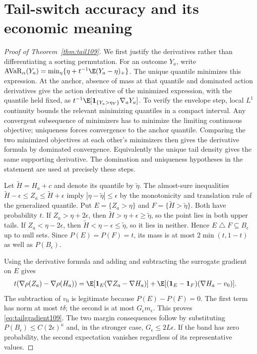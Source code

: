\section{Tail-switch accuracy and its economic meaning}\label{supp:tail109}
\begin{proof}[Proof of Theorem~\ref{thm:tail109}]
We first justify the derivatives rather than differentiating a sorting permutation. For an outcome $Y_a$, write
$\operatorname{AVaR}_\alpha(Y_a)=\min_\eta\{\eta+t^{-1}\E(Y_a-\eta)_+\}$.
The unique quantile minimizes this expression. At the anchor, absence of mass at that quantile and dominated action derivatives give the action derivative of the minimized expression, with the quantile held fixed, as
$t^{-1}\E[\boldsymbol1_{\{Y_a>\eta_Y\}}\nabla_aY_a]$.
To verify the envelope step, local $L^1$ continuity bounds the relevant minimizing quantiles in a compact interval. Any convergent subsequence of minimizers has to minimize the limiting continuous objective; uniqueness forces convergence to the anchor quantile. Comparing the two minimized objectives at each other's minimizers then gives the derivative formula by dominated convergence. Equivalently the unique tail density gives the same supporting derivative. The domination and uniqueness hypotheses in the statement are used at precisely these steps.

Let $\widetilde H=H_a+c$ and denote its quantile by $\widetilde\eta$. The almost-sure inequalities
$\widetilde H-\epsilon\le Z_a\le\widetilde H+\epsilon$
imply $|\eta-\widetilde\eta|\le\epsilon$ by the monotonicity and translation rule of the generalized quantile. Put $E=\{Z_a>\eta\}$ and $F=\{\widetilde H>\widetilde\eta\}$. Both have probability $t$. If $Z_a>\eta+2\epsilon$, then $\widetilde H>\eta+\epsilon\ge\widetilde\eta$, so the point lies in both upper tails. If $Z_a<\eta-2\epsilon$, then $\widetilde H<\eta-\epsilon\le\widetilde\eta$, so it lies in neither. Hence $E\mathbin\triangle F\subseteq B_\epsilon$ up to null sets. Since $P(E)=P(F)=t$, its mass is at most $2\min(t,1-t)$ as well as $P(B_\epsilon)$.

Using the derivative formula and adding and subtracting the surrogate gradient on $E$ gives
\begin{align*}
 t(\nabla\rho(Z_a)-\nabla\rho(H_a))
 &=\E[\boldsymbol1_E(\nabla Z_a-\nabla H_a)]
   +\E[(\boldsymbol1_E-\boldsymbol1_F)(\nabla H_a-v_0)].
\end{align*}
The subtraction of $v_0$ is legitimate because $P(E)-P(F)=0$. The first term has norm at most $t\delta$; the second is at most $G_\epsilon m_\epsilon$. This proves \eqref{eq:tailgradient109}. The two margin consequences follow by substituting $P(B_\epsilon)\le C(2\epsilon)^\kappa$ and, in the stronger case, $G_\epsilon\le2L\epsilon$. If the band has zero probability, the second expectation vanishes regardless of its representative values.


\end{proof}

